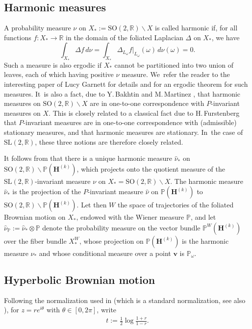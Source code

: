 \documentclass[JEP,XML,SOM,Unicode,published]{cedram}
\theoremstyle{plain}
\theoremstyle{definition}
\numberwithin{equation}{subsection}
\newcommand\bP{\mathbb{P}}
\newcommand\bR{\mathbb{R}}\let\R\bR
\newcommand{\SL}{\mathrm{SL}}
\newcommand{\SO}{\mathrm{SO}}
\newcommand{\bfH}{\boldsymbol{H}}
\newcommand{\bfv}{\boldsymbol{v}}
\newcommand{\defeq}{:=}
\begin{document}
\subsection{Harmonic measures}
A probability measure $\nu$ on $X_*:=\SO(2,\bR)\backslash X$ is called harmonic if, for all functions $f : X_* \to \bR$ in the domain of the foliated
Laplacian $\Delta$ on $X_*$, we have
\[
\int_{X_*} \Delta f\, d\nu= \int_{X_*} \Delta_{L_\omega} f|_{L_\omega}(\omega)\, d\nu(\omega)=0.
\]
Such a measure is also ergodic if $X_*$ cannot be partitioned into two union of leaves, each of which having positive $\nu$ measure. We~refer the reader to the interesting paper of Lucy Garnett \cite{Gar83} for details and for an ergodic theorem for such measures. It~is also a fact, due to Y.\,Bakhtin and M.\,Martinez \cite{BM08}, that harmonic measures on $\SO(2,\bR)\backslash X$ are in one-to-one correspondence with $P$-invariant measures on $X$. This is closely related to a classical fact due to H.\,Furstenberg \cite{Fur2,Fur1} that $P$-invariant measures are in one-to-one correspondence with (admissible) stationary measures, and that harmonic measures are stationary. In~the case of $\SL(2,\bR)$, these three notions are therefore closely related.

It follows from \cite{BEW20} that there is a unique harmonic
measure $\hat \nu_*$ on $\SO(2, \R) \backslash \bP(\bfH^{(k)})$, which projects onto the quotient measure of the $\SL(2,\R)$-invariant measure $\nu$ on $X_*= \SO(2, \R)\backslash X$. The harmonic measure $\hat \nu_*$ is the projection of the $P$-invariant measure $\hat \nu$ on
$\bP(\bfH^{(k)})$ to $\SO(2, \R) \backslash \bP(\bfH^{(k)})$.
Let then $W$ the space of trajectories of the foliated Brownian motion on $X_*$, endowed with the Wiener measure $\bP$, and let $\hat \nu_{\bP}\defeq \hat \nu_* \otimes \bP$ denote the probability measure on the vector bundle $\bP^W (\bfH^{(k)})$ over the fiber bundle $X_* ^W$, whose projection on $\bP(\bfH^{(k)})$ is the harmonic measure $\hat\nu_*$ and whose conditional measure over a point $\bfv$ is $\bP_\omega$.

\subsection{Hyperbolic Brownian motion}
Following the normalization used in \cite{For02} (which is a standard normalization, see also \cite{Hel00}), for $z = re^{i\theta}$ with $\theta \in [0,2\pi]$, write
\begin{align} t \defeq \frac{1}{2} \log \frac{1+r}{1-r}.
\end{align}
\end{document}
